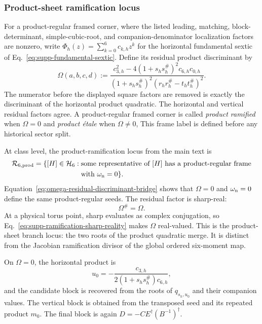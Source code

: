 \documentclass[aps,prx,reprint,nofootinbib,twoside,superscriptaddress,longbibliography,floatfix]{revtex4-2}
\theoremstyle{definition}
\newcommand{\HH}{\mathcal H}
\begin{document}
\subsubsection{{Product-sheet ramification locus}}
\label{sec:supp-product-ramification}

For a product-regular framed corner, where the listed leading, matching, block-determinant, simple-cubic-root, and companion-denominator localization factors are nonzero, write $\Phi_h(z)=\sum_{k=0}^6c_{k,h}z^k$ for the horizontal fundamental sextic of Eq.~\eqref{eq:supp-fundamental-sextic}. Define its residual product discriminant by
\begin{equation}
\Omega(a,b,c,d):=
\frac{c_{3,h}^2-4(1+s_hs_h^\#)^2c_{6,h}c_{0,h}}
{(1+s_hs_h^\#)^2(r_hr_h^\#-t_ht_h^\#)^2}.
\label{eq:supp-ramification-factorization}
\end{equation}
The numerator before the displayed square factors are removed is exactly the discriminant of the horizontal product quadratic. The horizontal and vertical residual factors agree. A product-regular framed corner is called \emph{product ramified} when $\Omega=0$ and \emph{product \'etale} when $\Omega\ne0$, This frame label is defined before any historical sector split.

At class level, the product-ramification locus from the main text is
\begin{equation}
\begin{aligned}
\mathcal R_{6,\mathrm{prod}}=\{[H]\in\HH_6:\;&\text{some representative of $[H]$ has a product-regular frame}\\
&\text{with $\omega_{\rm n}=0$}\}.
\end{aligned}
\label{eq:supp-product-branch-class-locus}
\end{equation}
{Equation~\eqref{eq:omega-residual-discriminant-bridge} shows that $\Omega=0$ and $\omega_{\rm n}=0$ define the same product-regular seeds. The residual factor is sharp-real:}
\begin{equation}
\Omega^\#=\Omega.
\label{eq:supp-ramification-sharp-reality}
\end{equation}
At a physical torus point, sharp evaluates as complex conjugation, so Eq.~\eqref{eq:supp-ramification-sharp-reality} makes $\Omega$ real-valued. This is the product-sheet branch locus: the two roots of the product quadratic merge.  It is distinct from the Jacobian ramification divisor of the global ordered six-moment map.

On $\Omega=0$, the horizontal product is
\begin{equation}
u_0=-\frac{c_{3,h}}{2(1+s_hs_h^\#)c_{6,h}},
\label{eq:supp-ramification-u0}
\end{equation}
and the candidate block is recovered from the roots of $q_{s_h,u_0}$ and their companion values.  The vertical block is obtained from the transposed seed and its repeated product $m_0$. The final block is again $D=-CE^\dagger(B^{-1})^\dagger$.
\end{document}
